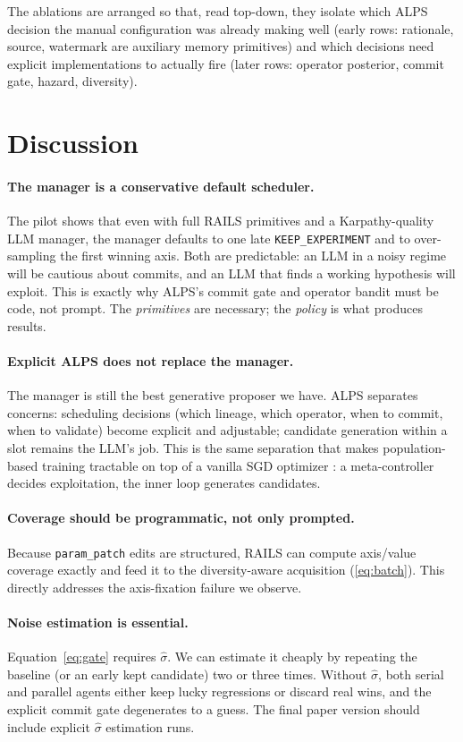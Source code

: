 \documentclass{article}
\newcommand{\alps}{ALPS\xspace}
\newcommand{\rails}{RAILS\xspace}
\newcommand{\keep}{\texttt{KEEP\_EXPERIMENT}\xspace}
\begin{document}
The ablations are arranged so that, read top-down, they isolate which \alps decision the manual configuration was already making well (early rows: rationale, source, watermark are auxiliary memory primitives) and which decisions need explicit implementations to actually fire (later rows: operator posterior, commit gate, hazard, diversity).

\section{Discussion}
\label{sec:discussion}

\paragraph{The manager is a conservative default scheduler.}
The pilot shows that even with full \rails primitives and a Karpathy-quality LLM manager, the manager defaults to one late \keep and to over-sampling the first winning axis. Both are predictable: an LLM in a noisy regime will be cautious about commits, and an LLM that finds a working hypothesis will exploit. This is exactly why \alps's commit gate and operator bandit must be code, not prompt. The \emph{primitives} are necessary; the \emph{policy} is what produces results.

\paragraph{Explicit \alps does not replace the manager.}
The manager is still the best generative proposer we have. \alps separates concerns: scheduling decisions (which lineage, which operator, when to commit, when to validate) become explicit and adjustable; candidate generation within a slot remains the LLM's job. This is the same separation that makes population-based training tractable on top of a vanilla SGD optimizer \citep{pbt}: a meta-controller decides exploitation, the inner loop generates candidates.

\paragraph{Coverage should be programmatic, not only prompted.}
Because \texttt{param\_patch} edits are structured, \rails can compute axis/value coverage exactly and feed it to the diversity-aware acquisition (\ref{eq:batch}). This directly addresses the axis-fixation failure we observe.

\paragraph{Noise estimation is essential.}
Equation~\ref{eq:gate} requires $\hat\sigma$. We can estimate it cheaply by repeating the baseline (or an early kept candidate) two or three times. Without $\hat\sigma$, both serial and parallel agents either keep lucky regressions or discard real wins, and the explicit commit gate degenerates to a guess. The final paper version should include explicit $\hat\sigma$ estimation runs.
\end{document}
